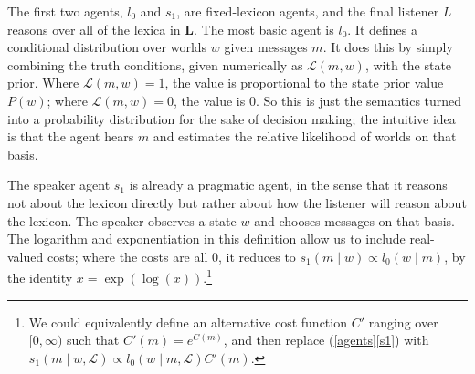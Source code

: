 \documentclass[leqno,12pt]{article}
\newcommand{\subeg}[2]{(\ref{#1}\ref{#2})}
\newcommand{\given}{\mid}
\newcommand{\state}{w}
\newcommand{\Lex}{\mathcal{L}}
\newcommand{\LexSet}{\mathbf{L}}
\newcommand{\msg}{m}
\newcommand{\Costs}{C}
\newcommand{\StatePrior}{P}
\newcommand{\listenerZero}{l_{0}}
\newcommand{\speakerOne}{s_{1}}
\newcommand{\UncertaintyListener}[1][]{L_{#1}}
\begin{document}
{The first two agents, $\listenerZero$ and $\speakerOne$, are
fixed-lexicon agents, and the final listener $\UncertaintyListener$
reasons over all of the lexica in $\LexSet$.  The most basic agent is
$\listenerZero$. It defines a conditional distribution over worlds
$\state$ given messages $\msg$. It does this by simply combining the
truth conditions, given numerically as $\Lex(\msg, \state)$, with the
state prior. Where $\Lex(\msg, \state)=1$, the value is proportional
to the state prior value $\StatePrior(\state)$; where
$\Lex(\msg, \state)=0$, the value is $0$. So this is just the
semantics turned into a probability distribution for the sake of
decision making; the intuitive idea is that the agent hears $\msg$ and
estimates the relative likelihood of worlds on that basis.

The speaker agent $\speakerOne$ is already a pragmatic agent, in the
sense that it reasons not about the lexicon directly but rather about
how the listener will reason about the lexicon. The speaker observes a
state $\state$ and chooses messages on that basis. The logarithm and
exponentiation in this definition allow us to include real-valued
costs; where the costs are all $0$, it reduces to
$\speakerOne(\msg \given \state) \propto \listenerZero(\state \given
\msg)$,
by the identity $x = \exp(\log(x))$.\footnote{We could equivalently define an
alternative cost function $\Costs'$ ranging over $[0,\infty)$ such
that $\Costs'(\msg)=e^{\Costs(\msg)}$, and then replace
\subeg{agents}{s1} with
$\speakerOne(\msg \given \state, \Lex) \propto \listenerZero(\state
\given \msg,\Lex)\Costs'(m)$.}

}
\end{document}
